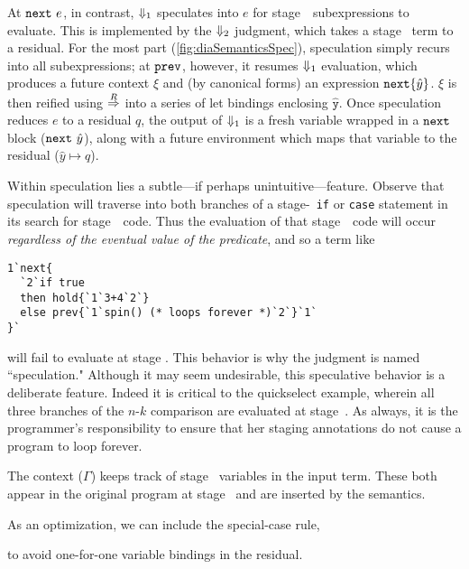 
At ${\tt next}~e$, in contrast, ${\Downarrow_{ 1}}$ speculates into $e$ for stage~\bbone\ 
subexpressions to evaluate.  This is implemented by the ${\Downarrow_{ 2}}$ judgment,
which takes a stage \bbtwo\ term to a residual. 
For the most part (\ref{fig:diaSemanticsSpec}), speculation simply recurs into
all subexpressions; at ${\tt prev}$, however, it resumes ${\Downarrow_{ 1}}$ evaluation,
which produces a future context $\xi$ and (by canonical forms) an expression
${\tt next}\{\hat y\}$. $\xi$ is then reified using $\overset{R}\Rightarrow$ into a series of let
bindings enclosing $\mathtt{\hat y}$.
Once speculation reduces $e$ to a residual $q$, the output of ${\Downarrow_{ 1}}$ is a
fresh variable wrapped in a ${\tt next}$ block (${\tt next}~\hat y$), along with a future
environment which maps that variable to the residual ($\hat y \mapsto q$).

Within speculation lies a subtle---if perhaps unintuitive---feature.  
Observe that speculation will traverse into both branches of a stage-\bbtwo\ {\tt if} or {\tt case} 
statement in its search for stage~\bbone\ code. 
Thus the evaluation of that stage~\bbone\ code will occur {\em regardless of the eventual value of the predicate},
and so a term like 
\begin{lstlisting} 
1`next{
  `2`if true 
  then hold{`1`3+4`2`} 
  else prev{`1`spin() (* loops forever *)`2`}`1`
}`
\end{lstlisting}
will fail to evaluate at stage \bbone.
This behavior is why the judgment is named ``speculation."
Although it may seem undesirable, this speculative behavior is a deliberate feature.
Indeed it is critical to the quickselect example, 
wherein all three branches of the $n$-$k$ comparison are evaluated at stage~\bbone.
As always, it is the programmer's responsibility to ensure that her staging annotations 
do not cause a program to loop forever.  

The context ($\Gamma$) keeps track of stage \bbtwo\ variables in the input term. 
These both appear in the original program at stage \bbtwo\ and are inserted by the semantics.

As an optimization, we can include the special-case rule,
\begin{mathpar}
\end{mathpar}
to avoid one-for-one variable bindings in the residual.

